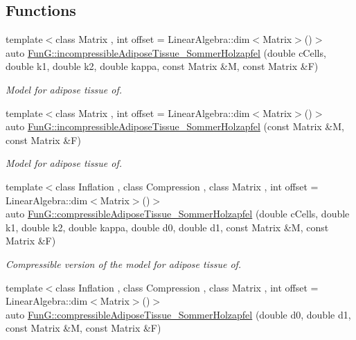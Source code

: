 \subsection*{\-Functions}
\begin{DoxyCompactItemize}
\item 
{\footnotesize template$<$class Matrix , int offset = \-Linear\-Algebra\-::dim$<$\-Matrix$>$()$>$ }\\auto \hyperlink{group__Biomechanics_gac269eefc1abb994044e1634c20a98061}{\-Fun\-G\-::incompressible\-Adipose\-Tissue\-\_\-\-Sommer\-Holzapfel} (double c\-Cells, double k1, double k2, double kappa, const \-Matrix \&\-M, const \-Matrix \&\-F)
\begin{DoxyCompactList}\small\item\em \-Model for adipose tissue of. \end{DoxyCompactList}\item 
{\footnotesize template$<$class Matrix , int offset = \-Linear\-Algebra\-::dim$<$\-Matrix$>$()$>$ }\\auto \hyperlink{group__Biomechanics_ga01ab128bcf179f4431b0270179af9e20}{\-Fun\-G\-::incompressible\-Adipose\-Tissue\-\_\-\-Sommer\-Holzapfel} (const \-Matrix \&\-M, const \-Matrix \&\-F)
\begin{DoxyCompactList}\small\item\em \-Model for adipose tissue of. \end{DoxyCompactList}\item 
{\footnotesize template$<$class Inflation , class Compression , class Matrix , int offset = \-Linear\-Algebra\-::dim$<$\-Matrix$>$()$>$ }\\auto \hyperlink{group__Biomechanics_ga5c3388564c0420b62e58f48c739d27f1}{\-Fun\-G\-::compressible\-Adipose\-Tissue\-\_\-\-Sommer\-Holzapfel} (double c\-Cells, double k1, double k2, double kappa, double d0, double d1, const \-Matrix \&\-M, const \-Matrix \&\-F)
\begin{DoxyCompactList}\small\item\em \-Compressible version of the model for adipose tissue of. \end{DoxyCompactList}\item 
{\footnotesize template$<$class Inflation , class Compression , class Matrix , int offset = \-Linear\-Algebra\-::dim$<$\-Matrix$>$()$>$ }\\auto \hyperlink{group__Biomechanics_ga27bb3f7c579ce8c21a69ea4d4d0169d7}{\-Fun\-G\-::compressible\-Adipose\-Tissue\-\_\-\-Sommer\-Holzapfel} (double d0, double d1, const \-Matrix \&\-M, const \-Matrix \&\-F)

\end{DoxyCompactItemize}
